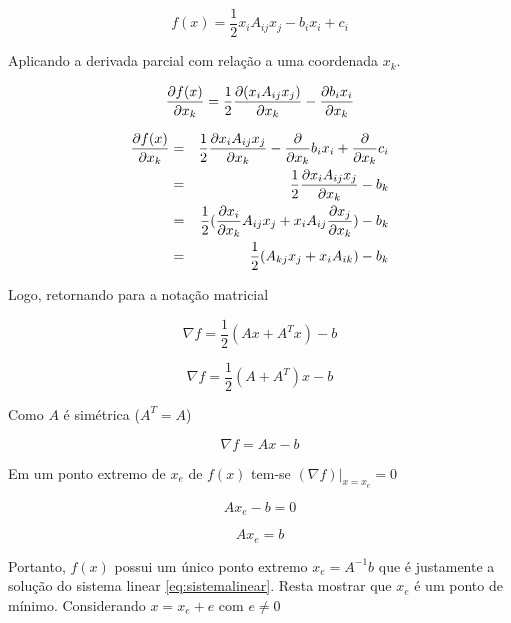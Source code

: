\begin{equation} \label{eq:quadratica_ind}
    f(x) = \frac{1}{2} x_i A_{ij} x_j - b_i x_i + c_i
\end{equation}


Aplicando a derivada parcial com relação a uma coordenada $x_k$.

\begin{equation}
    \dxk[f(x)] = \frac{1}{2}  \dxk[ (x_i A_{ij} x_j) ]- \dxk[b_i x_i]
\end{equation}

\begin{eqnarray}
     \dxk[f(x)] & = & \frac{1}{2} \dxk[ x_i A_{ij} x_j ]- \dxk{b_i x_i}+ \dxk{c_i} \\
                & = & \frac{1}{2} \dxk[ x_i A_{ij} x_j ]- b_k \\
                & = & \frac{1}{2} (\dxk[ x_i ]A_{ij} x_j  + x_i A_{ij} \dxk[x_j]) - b_k \\
                & = & \frac{1}{2}(A_{kj} x_j  + x_i A_{ik})  - b_k
\end{eqnarray}


Logo, retornando para a notação matricial


\begin{equation}
    \nabla f = \frac{1}{2} (Ax + A^T x) - b
\end{equation}


\begin{equation}
    \nabla f = \frac{1}{2} (A + A^T) x - b
\end{equation}

Como $A$ é simétrica ($A^T = A$)

\begin{equation} \label{eq:gradf}
    \nabla f = A x - b
\end{equation}

Em um ponto extremo de  $ x_e$ de $f(x)$ tem-se $(\nabla f)|_{x=x_e} = 0 $

\begin{equation}
    Ax_e - b = 0
\end{equation}

\begin{equation}
    Ax_e = b
\end{equation}

Portanto, $f(x)$ possui um único ponto extremo $x_e = A^{-1}b$ que é justamente a solução do sistema linear \ref{eq:sistemalinear}. Resta mostrar que $x_e$ é um ponto de mínimo.
Considerando $x = x_e + e$ com $e \neq 0 $


